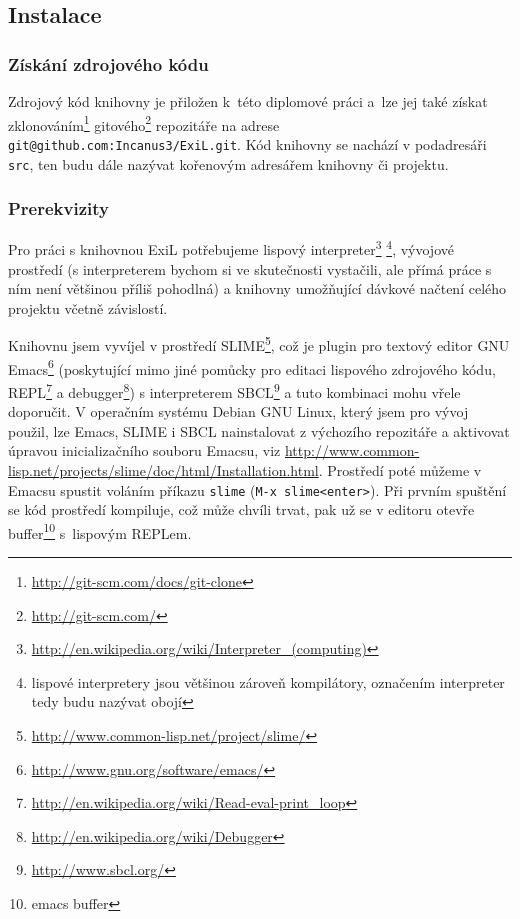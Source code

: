 \subsection{Instalace}
\subsubsection{Získání zdrojového kódu}
Zdrojový kód knihovny je přiložen k~této diplomové práci a~lze jej také získat
zklonováním\footnote{\url{http://git-scm.com/docs/git-clone}}
gitového\footnote{\url{http://git-scm.com/}} repozitáře na adrese
\verb|git@github.com:Incanus3/ExiL.git|.
Kód knihovny se nachází v podadresáři \verb|src|, ten budu dále nazývat kořenovým
adresářem knihovny či projektu.
\subsubsection{Prerekvizity}
Pro práci s knihovnou ExiL potřebujeme lispový
interpreter\footnote{\url{http://en.wikipedia.org/wiki/Interpreter_(computing)}}
\footnote{lispové interpretery jsou většinou zároveň
kompilátory\footnotemark[6], označením
interpreter tedy budu nazývat obojí},
vývojové prostředí (s interpreterem bychom si ve skutečnosti vystačili, ale
přímá práce s ním není většinou příliš pohodlná) a knihovny umožňující
dávkové načtení celého projektu včetně závislostí.

Knihovnu jsem vyvíjel v prostředí
SLIME\footnote{\url{http://www.common-lisp.net/project/slime/}}, což je plugin
pro textový editor GNU Emacs\footnote{\url{http://www.gnu.org/software/emacs/}}
(poskytující mimo jiné pomůcky pro editaci lispového zdrojového kódu,
REPL\footnote{\url{http://en.wikipedia.org/wiki/Read-eval-print_loop}} a
debugger\footnote{\url{http://en.wikipedia.org/wiki/Debugger}})
s interpreterem SBCL\footnote{\url{http://www.sbcl.org/}} a tuto kombinaci
mohu vřele doporučit. V operačním systému Debian GNU Linux, který jsem pro vývoj
použil, lze Emacs, SLIME i SBCL nainstalovat z výchozího repozitáře a aktivovat
úpravou inicializačního souboru Emacsu, viz
\url{http://www.common-lisp.net/projects/slime/doc/html/Installation.html}.
Prostředí poté můžeme v Emacsu spustit voláním příkazu \verb|slime|
(\verb|M-x slime<enter>|). Při prvním spuštění se kód prostředí kompiluje, což
může chvíli trvat, pak už se v editoru otevře buffer\footnote{emacs buffer}
s~lispovým REPLem.

